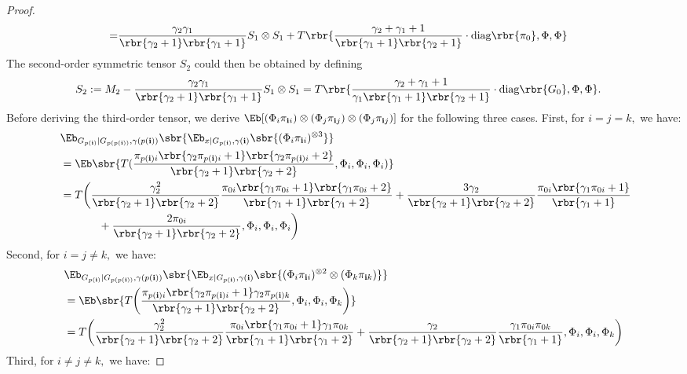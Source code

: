 \documentclass[twoside,11pt]{article}
\newcommand{\ib}{{\bf i}}
\begin{document}
{\begin{proof}
\begin{align}
         =&\frac{\gamma_2  \gamma_1}{\rbr{\gamma_2+1}\rbr{\gamma_1+1}} S_1 \otimes S_1 
         +  T\rbr{ \frac{\gamma_2 + \gamma_1 + 1}{ \rbr{\gamma_1+1}
             \rbr{\gamma_2+1} } \cdot \mathrm{diag}\rbr{\pi_0} , \Phi ,\Phi}
    \end{align}
   The second-order symmetric tensor $S_2$ could then be obtained by defining
  \begin{align}
    S_2 &:= M_2 - \frac{\gamma_2  \gamma_1}{\rbr{\gamma_2+1}\rbr{\gamma_1+1}} S_1 \otimes S_1= T\rbr{ \frac{\gamma_2 + \gamma_1 + 1}{\gamma_1
               \rbr{\gamma_1+1} \rbr{\gamma_2+1} } \cdot
             \mathrm{diag}\rbr{G_0} , \Phi,\Phi }.
  \end{align}
Before deriving the third-order tensor, we derive $\Eb[(\Phi_i \pi_{\ib i}) \otimes (\Phi_j \pi_{\ib j}) \otimes (\Phi_j \pi_{\ib j})]$ for the following three cases. First, for $i = j = k,$ we have:
\begin{equation}
\begin{aligned}
	&\Eb_{G_{p(\ib)} | G_{p(p(\ib))}, \gamma(p(\ib))}  \sbr{\Eb_{x|G_{p(\ib)}, \gamma(\ib)} \sbr{(\Phi_i \pi_{\ib i})^{\otimes 3} }} \\
	&= \Eb \sbr{T(\frac{\pi_{p(\ib) i} \rbr{\gamma_2\pi_{p(\ib) i}+1} \rbr{\gamma_2\pi_{p(\ib) i} +2}}{ \rbr{\gamma_2+1}\rbr{\gamma_2+2}}, \Phi_i, \Phi_i, \Phi_i)}\\
	&= T \bigg( \frac{\gamma_2^2}{\rbr{\gamma_2+1}\rbr{\gamma_2+2}}  \frac{\pi_{0i} \rbr{\gamma_1\pi_{0i}+1} \rbr{\gamma_1 \pi_{0i}+2}}{ \rbr{\gamma_1+1}\rbr{\gamma_1+2}} + \frac{3\gamma_2}{\rbr{\gamma_2+1}\rbr{\gamma_2+2}}  \frac{\pi_{0i}\rbr{\gamma_1 \pi_{0i}+1} }{ \rbr{\gamma_1+1}} \\\
	&\,\,\,\,\,\,\,\,\,\,\,\, \,\,\,\,\,\,\,\,\,+ \frac{2 \pi_{0i}}{\rbr{\gamma_2+1}\rbr{\gamma_2+2}}, \Phi_i,\Phi_i,\Phi_i \bigg)
\end{aligned}
\end{equation}
Second, for $i = j \neq k,$ we have:
\begin{equation}
\begin{aligned}
\label{eq:moment_2}
	&\Eb_{G_{p(\ib)} | G_{p(p(\ib))}, \gamma(p(\ib))} \sbr{\Eb_{x|G_{p(\ib)}, \gamma(\ib)}\sbr{(\Phi_i \pi_{\ib i})^{\otimes 2}\otimes (\Phi_k \pi_{\ib k})}}\\
	& = \Eb \sbr{T\bigg( \frac{ \pi_{p(\ib)i}\rbr{\gamma_2 \pi_{p(\ib)i}+1} \gamma_2 \pi_{p(\ib)k} }{ \rbr{\gamma_2+1}\rbr{\gamma_2+2}}, \Phi_i, \Phi_i, \Phi_k \bigg)}\\
	 &= T \bigg( \frac{\gamma_2^2}{\rbr{\gamma_2+1}\rbr{\gamma_2+2}}  \frac{ \pi_{0i} \rbr{\gamma_1 \pi_{0i}+1}\gamma_1 \pi_{0k}}{ \rbr{\gamma_1+1}\rbr{\gamma_1+2}}+ \frac{\gamma_2}{\rbr{\gamma_2+1}\rbr{\gamma_2+2}}  \frac{\gamma_1 \pi_{0i}\pi_{0k}}{ \rbr{\gamma_1+1}} , \Phi_i,\Phi_i,\Phi_k \bigg)
\end{aligned}
\end{equation}
Third, for $i \neq j \neq k,$ we have:


\end{proof}}
\end{document}
